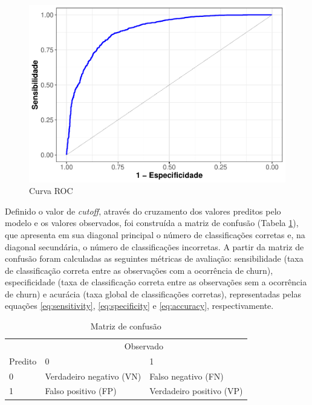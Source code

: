 \documentclass[twocolumn]{rbef}
\newcommand{\1}{\mathbbm{1}}
\begin{document}
\begin{figure}

{\centering \includegraphics[width=1\linewidth]{article_files/figure-latex/roc-1} 

}

\caption{Curva ROC}\label{fig:roc}
\end{figure}

Definido o valor de \textit{cutoff}, através do cruzamento dos valores preditos pelo modelo e os valores observados, foi construída a matriz de confusão (Tabela \ref{tab:cmatrix}), que apresenta em sua diagonal principal o número de classificações corretas e, na diagonal secundária, o número de classificações incorretas. A partir da matriz de confusão foram calculadas as seguintes métricas de avaliação: sensibilidade (taxa de classificação correta entre as observações com a ocorrência de churn), especificidade (taxa de classificação correta entre as observações sem a ocorrência de churn) e acurácia (taxa global de classificações corretas), representadas pelas equações \eqref{eq:sensitivity}, \eqref{eq:specificity} e \eqref{eq:accuracy}, respectivamente.

\begin{table}

\caption{\label{tab:cmatrix}Matriz de confusão}
\centering
\fontsize{9}{11}\selectfont
\begin{tabular}[t]{lll}
\toprule
\multicolumn{1}{c}{} & \multicolumn{2}{c}{Observado} \\
\cmidrule(l{3pt}r{3pt}){2-3}
Predito & 0 & 1\\
\midrule
0 & Verdadeiro negativo (VN) & Falso negativo (FN)\\
1 & Falso positivo (FP) & Verdadeiro positivo (VP)\\
\bottomrule
\end{tabular}
\end{table}
\end{document}
